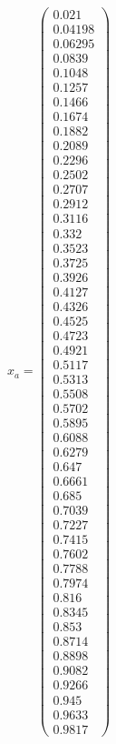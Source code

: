 \documentclass{udpreport}
\begin{document}
\begin{enumerate}
\begin{enumerate}
\begin{itemize}
				$x_{a} = \left(\begin{array}{c} 0.021\\ 0.04198\\ 0.06295\\ 0.0839\\ 0.1048\\ 0.1257\\ 0.1466\\ 0.1674\\ 0.1882\\ 0.2089\\ 0.2296\\ 0.2502\\ 0.2707\\ 0.2912\\ 0.3116\\ 0.332\\ 0.3523\\ 0.3725\\ 0.3926\\ 0.4127\\ 0.4326\\ 0.4525\\ 0.4723\\ 0.4921\\ 0.5117\\ 0.5313\\ 0.5508\\ 0.5702\\ 0.5895\\ 0.6088\\ 0.6279\\ 0.647\\ 0.6661\\ 0.685\\ 0.7039\\ 0.7227\\ 0.7415\\ 0.7602\\ 0.7788\\ 0.7974\\ 0.816\\ 0.8345\\ 0.853\\ 0.8714\\ 0.8898\\ 0.9082\\ 0.9266\\ 0.945\\ 0.9633\\ 0.9817 \end{array}\right)$
				

\end{itemize}
\end{enumerate}
\end{enumerate}
\end{document}
